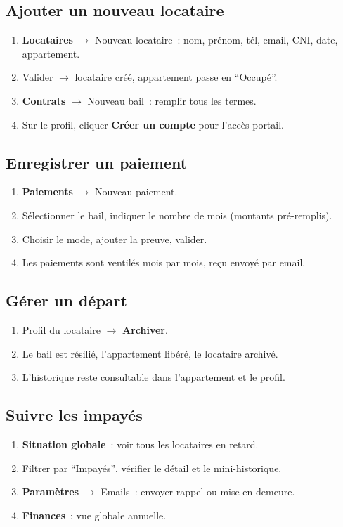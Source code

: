 \documentclass[12pt,a4paper]{article}
\begin{document}
\subsection{Ajouter un nouveau locataire}
\begin{enumerate}
\item \textbf{Locataires} $\rightarrow$ Nouveau locataire~: nom, pr\'enom, t\'el, email, CNI, date, appartement.
\item Valider $\rightarrow$ locataire cr\'e\'e, appartement passe en ``Occup\'e''.
\item \textbf{Contrats} $\rightarrow$ Nouveau bail~: remplir tous les termes.
\item Sur le profil, cliquer \textbf{Cr\'eer un compte} pour l'acc\`es portail.
\end{enumerate}

\subsection{Enregistrer un paiement}
\begin{enumerate}
\item \textbf{Paiements} $\rightarrow$ Nouveau paiement.
\item S\'electionner le bail, indiquer le nombre de mois (montants pr\'e-remplis).
\item Choisir le mode, ajouter la preuve, valider.
\item Les paiements sont ventil\'es mois par mois, re\c{c}u envoy\'e par email.
\end{enumerate}

\subsection{G\'erer un d\'epart}
\begin{enumerate}
\item Profil du locataire $\rightarrow$ \textbf{Archiver}.
\item Le bail est r\'esili\'e, l'appartement lib\'er\'e, le locataire archiv\'e.
\item L'historique reste consultable dans l'appartement et le profil.
\end{enumerate}

\subsection{Suivre les impay\'es}
\begin{enumerate}
\item \textbf{Situation globale}~: voir tous les locataires en retard.
\item Filtrer par ``Impay\'es'', v\'erifier le d\'etail et le mini-historique.
\item \textbf{Param\`etres} $\rightarrow$ Emails~: envoyer rappel ou mise en demeure.
\item \textbf{Finances}~: vue globale annuelle.
\end{enumerate}
\end{document}
